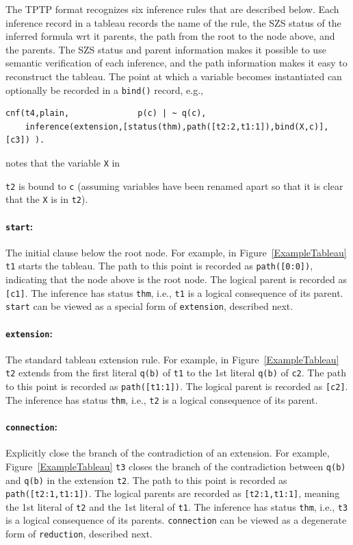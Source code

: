 \documentclass[runningheads]{llncs}
\newcommand{\smalltt}[1]{\small \texttt{#1}}
\newcommand{\mytilde}{\raisebox{0.4ex}{\texttildelow}}
\begin{document}
The TPTP format recognizes six inference rules that are described below.
Each inference record in a tableau records the name of the rule, the SZS status of the
inferred formula wrt it parents, the path from the root to the node above, and the parents.
The SZS status and parent information makes it possible to use semantic verification of each
inference, and the path information makes it easy to reconstruct the tableau.
The point at which a variable becomes instantiated can optionally be recorded in a {\tt bind()} 
record, e.g., 
{\footnotesize
\begin{verbatim}
cnf(t4,plain,              p(c) | ~ q(c),
    inference(extension,[status(thm),path([t2:2,t1:1]),bind(X,c)],[c3]) ).
\end{verbatim}
}
\noindent
notes that the variable {\smalltt{X}} in {\smalltt{t2} is bound to {\smalltt{c}} (assuming 
variables have been renamed apart so that it is clear that the {\smalltt X} is in {\smalltt{t2}}).

\paragraph{{\tt start}:} The initial clause below the root node.
For example, in Figure~\ref{ExampleTableau} {\smalltt{t1}} starts the tableau.
The path to this point is recorded as {\smalltt{path([0:0])}}, indicating that the node above
is the root node.
The logical parent is recorded as {\smalltt{[c1]}}. 
The inference has status {\smalltt{thm}}, i.e., {\smalltt{t1}} is a logical consequence of its
parent.
{\tt start} can be viewed as a special form of {\tt extension}, described next.

\paragraph{{\tt extension}:} The standard tableau extension rule.
For example, in Figure~\ref{ExampleTableau} {\smalltt{t2}} extends from the first literal 
{\smalltt{q(b)}} of {\smalltt{t1}} to the 1st literal {\smalltt{{\mytilde}q(b)}} of {\smalltt{c2}}.
The path to this point is recorded as {\smalltt{path([t1:1])}}. 
The logical parent is recorded as {\smalltt{[c2]}}. 
The inference has status {\smalltt{thm}}, i.e., {\smalltt{t2}} is a logical consequence of its
parent.

\paragraph{{\tt connection}:} Explicitly close the branch of the contradiction of an extension.
For example, Figure~\ref{ExampleTableau} {\smalltt{t3}} closes the branch of the contradiction 
between {\smalltt{q(b)}} and {\smalltt{{\mytilde}q(b)}} in the extension {\smalltt{t2}}.
The path to this point is recorded as {\smalltt{path([t2:1,t1:1])}}.
The logical parents are recorded as {\smalltt{[t2:1,t1:1]}}, meaning the 1st literal of 
{\smalltt{t2}} and the 1st literal of {\smalltt{t1}}. 
The inference has status {\smalltt{thm}}, i.e., {\smalltt{t3}} is a logical consequence of its
parents. 
{\tt connection} can be viewed as a degenerate form of {\tt reduction}, described next.

}
\end{document}
